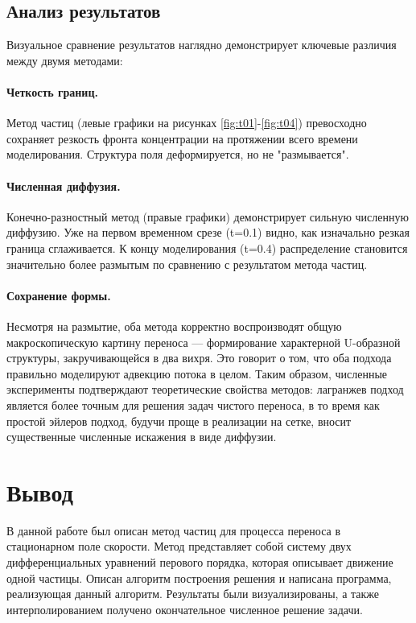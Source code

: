 \documentclass[a4paper,12pt]{article}
\begin{document}
\newpage

\subsection{Анализ результатов}
Визуальное сравнение результатов наглядно демонстрирует ключевые различия между двумя методами:

\paragraph{Четкость границ.} Метод частиц (левые графики на рисунках \ref{fig:t01}-\ref{fig:t04}) превосходно сохраняет резкость фронта концентрации на протяжении всего времени моделирования. Структура поля деформируется, но не "размывается".

\paragraph{Численная диффузия.} Конечно-разностный метод (правые графики) демонстрирует сильную численную диффузию. Уже на первом временном срезе (t=0.1) видно, как изначально резкая граница сглаживается. К концу моделирования (t=0.4) распределение становится значительно более размытым по сравнению с результатом метода частиц.

\paragraph{Сохранение формы.} Несмотря на размытие, оба метода корректно воспроизводят общую макроскопическую картину переноса — формирование характерной U-образной структуры, закручивающейся в два вихря. Это говорит о том, что оба подхода правильно моделируют адвекцию потока в целом.
Таким образом, численные эксперименты подтверждают теоретические свойства методов: лагранжев подход является более точным для решения задач чистого переноса, в то время как простой эйлеров подход, будучи проще в реализации на сетке, вносит существенные численные искажения в виде диффузии.

\newpage

\section{Вывод}
В данной работе был описан метод частиц для процесса переноса в стационарном поле скорости. Метод представляет собой систему двух дифференциальных уравнений перового порядка, которая описывает движение одной частицы. Описан алгоритм построения решения и написана программа, реализующая данный алгоритм. Результаты были визуализированы, а также интерполированием получено окончательное численное решение задачи.
\end{document}
